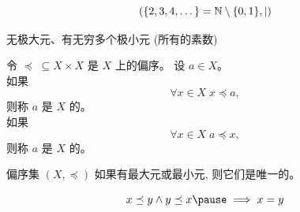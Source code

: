 \begin{frame}{}
  \begin{exampleblock}{}
    \[
      (\{2, 3, 4, \dots\} = \mathbb{N} \setminus \{0, 1\}, \mid)
    \]
  \end{exampleblock}

  \pause

  \pause
  \begin{center}
    无极大元、有无穷多个极小元 (所有的素数)
  \end{center}
\end{frame}

\begin{frame}{}
  \begin{definition}
    令 $\preceq \;\subseteq X \times X$ 是 $X$ 上的偏序。
    设 $a \in X$。\\[5pt]

    \pause
    如果
    \[
      \forall x \in X\; x \preceq a,
    \]
    则称 $a$ 是 $X$ 的。\\[10pt]

    \pause
    如果
    \[
      \forall x \in X\; a \preceq x,
    \]
    则称 $a$ 是 $X$ 的。
  \end{definition}

  \pause
  \vspace{0.30cm}
  \begin{center}
  \end{center}
\end{frame}

\begin{frame}{}
  \begin{theorem}
    偏序集 $(X, \preceq)$ 如果有最大元或最小元, 则它们是唯一的。
  \end{theorem}

  \pause
  \vspace{0.30cm}
  \begin{center}

    \pause
    \[
      x \preceq y \land y \preceq x \pause \implies x = y
    \]
    \vspace{-0.60cm}
    \begin{center}
    \end{center}
  \end{center}
\end{frame}

